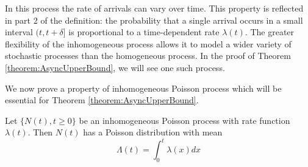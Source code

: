 In this process the rate of arrivals can vary over time. This property is reflected in part 2 of the definition: the probability that a single arrival occurs in a small interval $(t, t+\delta]$ is proportional to a time-dependent rate $\lambda(t)$. The greater flexibility of the inhomogeneous process allows it to model a wider variety of stochastic processes than the homogeneous process. In the proof of Theorem \ref{theorem:AsyncUpperBound}, we will see one such process.

We now prove a property of inhomogeneous Poisson process which will be essential for Theorem \ref{theorem:AsyncUpperBound}. 

\begin{theorem}
	Let $\{N(t), t \geq 0\}$ be an inhomogeneous Poisson process with rate function $\lambda(t)$. Then $N(t)$ has a Poisson distribution with mean
	$$
		\Lambda(t) = \int_0^t \lambda(x) dx
	$$
\end{theorem}

